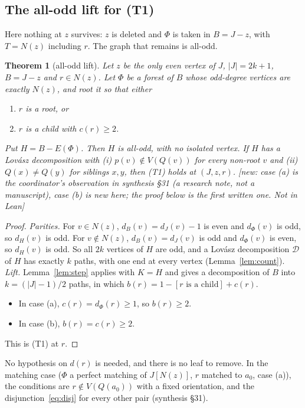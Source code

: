 \documentclass[11pt]{amsart}
\newtheorem{theorem}{Theorem}[section]
\theoremstyle{definition}
\newcommand{\st}[1]{\textsf{\small[#1]}}
\newcommand{\cD}{\mathcal D}
\begin{document}
\subsection{The all-odd lift for (T1)}\label{sec:allodd}

Here nothing at $z$ survives: $z$ is deleted and $\Phi$ is taken in $B=J-z$, with $T=N(z)$ including
$r$. The graph that remains is all-odd.

\begin{theorem}[all-odd lift]\label{thm:allodd}
Let $z$ be the only even vertex of $J$, $|J|=2k+1$, $B=J-z$ and $r\in N(z)$. Let $\Phi$ be a forest of
$B$ whose odd-degree vertices are exactly $N(z)$, and root it so that either
\begin{enumerate}[label=(\alph*)]
\item $r$ is a root, or
\item $r$ is a child with $c(r)\ge2$.
\end{enumerate}
Put $H=B-E(\Phi)$. Then $H$ is all-odd, with no isolated vertex. If $H$ has a Lov\'asz decomposition
with (i) $p(v)\notin V(Q(v))$ for every non-root $v$ and (ii) $Q(x)\ne Q(y)$ for siblings $x,y$, then
(T1) holds at $(J,z,r)$. \st{new: case (a) is the coordinator's observation in synthesis \S31 (a research note, not a
manuscript), case (b) is new here; the proof below is the first written one. Not in Lean}
\end{theorem}

\begin{proof}
\emph{Parities.} For $v\in N(z)$, $d_B(v)=d_J(v)-1$ is even and $d_\Phi(v)$ is odd, so $d_H(v)$ is odd.
For $v\notin N(z)$, $d_B(v)=d_J(v)$ is odd and $d_\Phi(v)$ is even, so $d_H(v)$ is odd. So all $2k$
vertices of $H$ are odd, and a Lov\'asz decomposition $\cD$ of $H$ has exactly $k$ paths, with one end
at every vertex (Lemma~\ref{lem:count}). \emph{Lift.} Lemma~\ref{lem:step} applies with $K=H$ and gives
a decomposition of $B$ into $k=(|J|-1)/2$ paths, in which $b(r)=1-[r\text{ is a child}]+c(r)$.
\begin{itemize}[leftmargin=*]
\item In case (a), $c(r)=d_\Phi(r)\ge1$, so $b(r)\ge2$.
\item In case (b), $b(r)=c(r)\ge2$.
\end{itemize}
This is (T1) at $r$.
\end{proof}

No hypothesis on $d(r)$ is needed, and there is no leaf to remove. In the matching case ($\Phi$ a
perfect matching of $J[N(z)]$, $r$ matched to $a_0$, case (a)), the conditions are $r\notin V(Q(a_0))$
with a fixed orientation, and the disjunction~\eqref{eq:disj} for every other pair (synthesis \S31).
\end{document}
